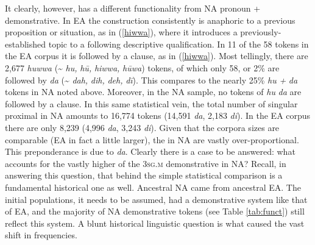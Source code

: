\documentclass[output=paper]{langsci/langscibook}
\begin{document}
It clearly, however, has a different functionality from NA pronoun + demonstrative. In EA the construction consistently is anaphoric to a previous proposition or situation, as in (\ref{hiwwa}), where it introduces a previously-established topic to a following descriptive qualification. In 11 of the 58 tokens in the EA corpus it is followed by a  clause, as in (\ref{hiwwa}). Most tellingly, there are 2,677 \textit{huwwa} ({\textasciitilde} \textit{hu,} \textit{hū,} \textit{hiwwa,} \textit{hūwa}) tokens, of which only 58, or 2\% are followed by \textit{da} ({\textasciitilde} \textit{dah,} \textit{dih,} \textit{deh,} \textit{dī}). This compares to the nearly 25\% \textit{hu} \textit{+} \textit{da} tokens in NA noted above. Moreover, in the NA sample, no tokens of \textit{hu} \textit{da} are followed by a  clause. In this same statistical vein, the total number of singular proximal  in NA amounts to 16,774 tokens (14,591 \textit{da}, 2,183 \textit{di}). In the EA corpus there are only 8,239 (4,996 \textit{da}, 3,243 \textit{di}). Given that the corpora sizes are comparable (EA in fact a little larger), the  in NA are vastly over-proportional. This preponderance is due to \textit{da}. Clearly there is a case to be answered: what accounts for the vastly higher  of the 3\textsc{sg.m} demonstrative in NA? Recall, in answering this question, that behind the simple statistical comparison is a fundamental historical one as well. Ancestral NA came from ancestral EA. The initial populations, it needs to be assumed, had a demonstrative system like that of EA, and the majority of NA demonstrative tokens (see Table \ref{tab:funct}) still reflect this system. A blunt historical linguistic question is what caused the vast shift in frequencies.
\end{document}
